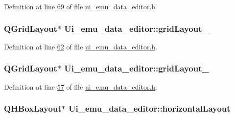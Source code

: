 Definition at line \hyperlink{a00051_source_l00069}{69} of file \hyperlink{a00051_source}{ui\+\_\+emu\+\_\+data\+\_\+editor.\+h}.

\hypertarget{a00026_a8e397832e536976b6717e1d509226b8d}{
\subsubsection[{grid\+Layout\+\_\+4}]{\setlength{\rightskip}{0pt plus 5cm}Q\+Grid\+Layout$\ast$ Ui\+\_\+emu\+\_\+data\+\_\+editor\+::grid\+Layout\+\_}}\label{a00026_a8e397832e536976b6717e1d509226b8d}


Definition at line \hyperlink{a00051_source_l00062}{62} of file \hyperlink{a00051_source}{ui\+\_\+emu\+\_\+data\+\_\+editor.\+h}.

\hypertarget{a00026_ac56612bd2595405ccbdfe4aae45eccd7}{
\subsubsection[{grid\+Layout\+\_\+5}]{\setlength{\rightskip}{0pt plus 5cm}Q\+Grid\+Layout$\ast$ Ui\+\_\+emu\+\_\+data\+\_\+editor\+::grid\+Layout\+\_}}\label{a00026_ac56612bd2595405ccbdfe4aae45eccd7}


Definition at line \hyperlink{a00051_source_l00057}{57} of file \hyperlink{a00051_source}{ui\+\_\+emu\+\_\+data\+\_\+editor.\+h}.

\hypertarget{a00026_ad3009fa6ef8958b3e052715beba75d28}{
\subsubsection[{horizontal\+Layout}]{\setlength{\rightskip}{0pt plus 5cm}Q\+H\+Box\+Layout$\ast$ Ui\+\_\+emu\+\_\+data\+\_\+editor\+::horizontal\+Layout}}\label{a00026_ad3009fa6ef8958b3e052715beba75d28}


